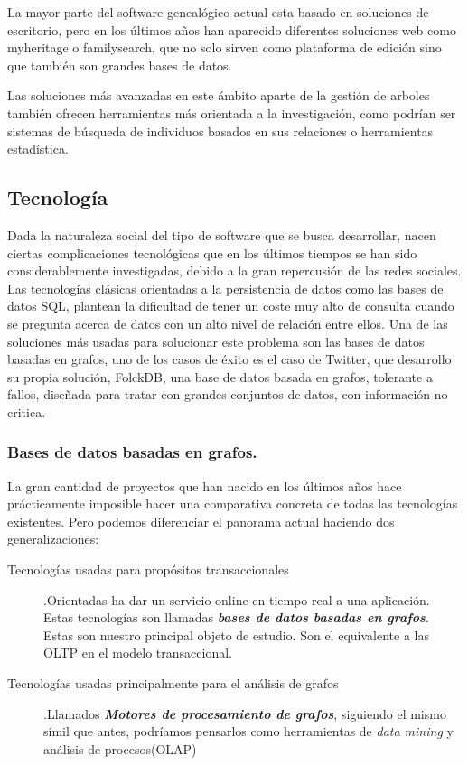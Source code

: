 \documentclass[12pt]{article} %
\begin{document}
La mayor parte del software genealógico actual esta basado en soluciones de escritorio, pero en los últimos años han aparecido diferentes soluciones web como myheritage o familysearch, que no solo sirven como plataforma de edición sino que también son grandes bases de datos.

Las soluciones más avanzadas en este ámbito aparte de la gestión de arboles también ofrecen herramientas más orientada a la investigación, como podrían ser sistemas de búsqueda de individuos basados en sus relaciones o herramientas estadística.

\subsection{Tecnología}
Dada la naturaleza social del tipo de software que se busca desarrollar, nacen ciertas complicaciones tecnológicas que en los últimos tiempos se han sido considerablemente investigadas, debido a la gran repercusión de las redes sociales. Las tecnologías clásicas orientadas a la persistencia de datos como las bases de datos SQL, plantean la dificultad de tener un coste muy alto de consulta cuando se pregunta acerca de datos  con un alto nivel de relación entre ellos. Una de las soluciones más usadas para solucionar este problema son las bases de datos basadas en grafos, uno de los casos de éxito es el caso de Twitter, que desarrollo su propia solución, FolckDB, una base de datos basada en grafos, tolerante a fallos, diseñada para tratar con grandes conjuntos de datos, con información no critica.

\subsubsection{Bases de datos basadas en grafos.}
La gran cantidad de proyectos que han nacido en los últimos años hace prácticamente imposible hacer una comparativa concreta de todas las tecnologías existentes. Pero podemos diferenciar el panorama actual haciendo dos generalizaciones:
\begin{description}
\item[Tecnologías usadas para propósitos transaccionales].\linebreak Orientadas ha dar un servicio online en tiempo real a una aplicación.
\linebreak Estas tecnologías son llamadas \textbf\textit{bases de datos basadas en grafos}. Estas son nuestro principal objeto de estudio. Son el equivalente a las OLTP en el modelo transaccional.
\item[Tecnologías usadas principalmente para el análisis de grafos].\linebreak Llamados \textbf\textit{Motores de procesamiento de grafos}, siguiendo el mismo símil que antes, podríamos pensarlos como herramientas de \textit{data mining} y análisis de procesos(OLAP)
\end{description}
\end{document}
